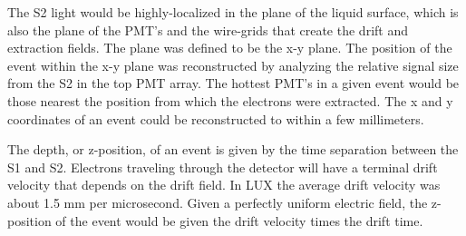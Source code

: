 The S2 light would be highly-localized in the plane of the liquid surface, which is also the plane of the PMT's and the wire-grids that create the drift and extraction fields. The plane was defined to be the x-y plane. The position of the event within the x-y plane was reconstructed by analyzing the relative signal size from the S2 in the top PMT array. The hottest PMT's in a given event would be those nearest the position from which the electrons were extracted. The x and y coordinates of an event could be reconstructed to within a few millimeters.

The depth, or z-position, of an event is given by the time separation between the S1 and S2. Electrons traveling through the detector will have a terminal drift velocity that depends on the drift field. In LUX the average drift velocity was about 1.5 mm per microsecond. Given a perfectly uniform electric field, the z-position of the event would be given the drift velocity times the drift time.


